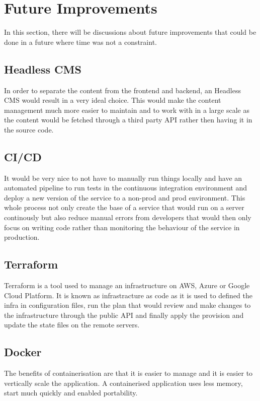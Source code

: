 \section{Future Improvements}
\label{s:Future-improvements}
In this section, there will be discussions about future improvements that could be
done in a future where time was not a constraint.

\subsection{Headless CMS}
\label{s:Headless-CMS}
In order to separate the content from the frontend and backend, an Headless CMS
would result in a very ideal choice. This would make the content management much
more easier to maintain and to work with in a large scale as the content would be
fetched through a third party API rather then having it in the source code.

\subsection{CI/CD}
\label{s:CI-CD}
It would be very nice to not have to manually run things locally and have an
automated pipeline to run tests in the continuous integration environment and
deploy a new version of the service to a non-prod and prod environment. This
whole process not only create the base of a service that would run on a server
continously but also reduce manual errors from developers that would then only
focus on writing code rather than monitoring the behaviour of the service in
production.

\subsection{Terraform}
\label{s:Terraform}
Terraform is a tool used to manage an infrastructure on AWS, Azure or Google
Cloud Platform. It is known as infrastracture as code as it is used to defined
the infra in configuration files, run the plan that would review and make
changes to the infrastructure through the public API and finally apply the
provision and update the state files on the remote servers.

\subsection{Docker}
\label{s:Docker}
The benefits of containerisation are that it is easier to manage and it is
easier to vertically scale the application. A containerised application uses less
memory, start much quickly and enabled portability.

